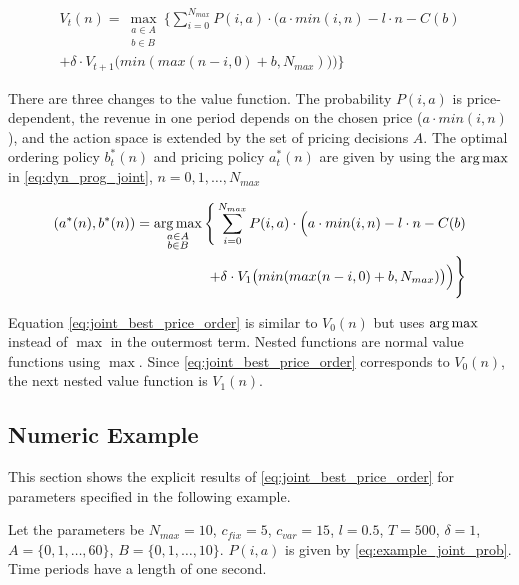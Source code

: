 \begin{equation}
\begin{split}
V_t(n) = \max_{\substack{a \in A \\ b \in B}} \Bigg\{
\sum_{i = 0}^{N_{max}}
P(i, a) \cdot \Big(
a \cdot min(i, n) %
- l \cdot n %
- C(b) %
 \\
+ \delta \cdot V_{t+1}\big(min(max(n - i, 0) + b, N_{max})\big)
\Big)\Bigg\}
\end{split}
\label{eq:dyn_prog_joint}
\end{equation}

There are three changes to the value function.
The probability $P(i, a)$ is price-dependent, the revenue in one period depends on the chosen price ($a \cdot min(i, n)$), and the action space is extended by the set of pricing decisions $A$.
The optimal ordering policy $b^*_t(n)$ and pricing policy $a^*_t(n)$ are given by using the $\operatorname*{arg\,max}$ in \cref{eq:dyn_prog_joint}, $n=0,1,\ldots,N_{max}$

\begin{equation}
\begin{split}
(a^*(n), b^*(n)) = \argmax_{\substack{a \in A \\ b \in B}} \Bigg\{
\sum_{i = 0}^{N_{max}}
P(i, a) \cdot \Big(
a \cdot min(i, n) %
- l \cdot n %
- C(b) %
 \\
+ \delta \cdot V_{1}\big(min(max(n - i, 0) + b, N_{max})\big)
\Big)\Bigg\}
\end{split}
\label{eq:joint_best_price_order}
\end{equation}

Equation \cref{eq:joint_best_price_order} is similar to $V_0(n)$ but uses $\operatorname*{arg\,max}$ instead of $\max$ in the outermost term.
Nested functions are normal value functions using $\max$.
Since \cref{eq:joint_best_price_order} corresponds to $V_0(n)$, the next nested value function is $V_1(n)$.

\subsection{Numeric Example}
\label{section:joint_example}
This section shows the explicit results of \cref{eq:joint_best_price_order} for parameters specified in the following example.

\begin{example}
Let the parameters be $N_{max} = 10$, $c_{fix} = 5$, $c_{var} = 15$, $l = 0.5$,
$T = 500$, $\delta = 1$, $A = \{0, 1, \ldots, 60\}$, $B = \{0, 1, \ldots, 10\}$.
$P(i, a)$ is given by \cref{eq:example_joint_prob}.
Time periods have a length of one second.
\label{example:joint}
\end{example}

